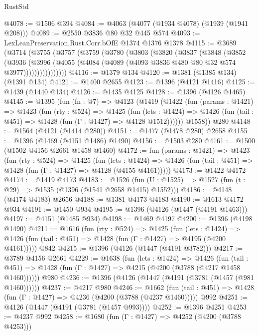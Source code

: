 \begin{lexlean}{RustStd}
\begin{coremodule}
@4078 := @1506 @394
@4084 := @4063 (@4077 (@1934 @4078) (@1939 (@1941 @208)))
@4089 := @2550 @3836 @80 @32 @445 @574
@4093 := LexLeanPreservation.Rust.Corr.bOfE @1374 @1376 @1378
@4115 := @3689
    (@3714
      (@3755
        (@3757
          (@3759
            (@3780
              (@3803
                (@3820
                  (@3837
                    (@3848
                      (@3852
                        (@3936
                          (@3996
                            (@4055
                              (@4084 (@4089 (@4093 @3836 @480 @80 @32 @574 @3977))))))))))))))))
@4116 := @1379 @134
@4120 := @1381 (@1385 @134) (@1391 @134)
@4121 := @1400 @2655
@4123 := @1396 (@4121 @1416)
@4125 := @1439 (@1440 @134)
@4126 := @1435 @4125
@4128 := @1396 (@4126 @1465)
@4145 := @1395
    (fun (fn : @7) =>
    @4123
      (@1419
        (@1422
          (fun (params : @1421) =>
          @1423
            (fun (rty : @524) =>
            @1425
              (fun (lets : @1424) =>
              @1426 (fun (tail : @451) => @1428 (fun (Γ : @1427) => @4128 @1512))))))
        @1558))
    @280
@4148 := @1564 (@4121 (@1414 @280))
@4151 := @1477 (@1478 @280) @2658
@4155 := @1396 (@1469 (@4151 @1486) @1490)
@4156 := @1503 @280
@4161 := @1500 (@1502 @4156 @2661 @1458 @1460)
@4172 := fun (params : @1421) =>
  @1423
    (fun (rty : @524) =>
    @1425
      (fun (lets : @1424) =>
      @1426 (fun (tail : @451) => @1428 (fun (Γ : @1427) => @4128 (@4155 @4161)))))
@4173 := @1422 @4172
@4174 := @1419 @4173
@4183 := @1526 (fun (U : @1525) => @1527 (fun (t : @29) => @1535 (@1396 (@1541 @2658 @1415) @1552)))
@4186 := @4148 (@4174 @4183) @2656
@4188 := @1381 @4173 @4183
@4190 := @1613 @4172 @934
@4191 := @1450 @934
@4195 := @1396 (@4126 (@1447 (@4191 @1463)))
@4197 := @4151 (@1485 @934)
@4198 := @1469 @4197
@4200 := @1396 (@4198 @1490)
@4211 := @1616
    (fun (rty : @524) =>
    @1425
      (fun (lets : @1424) =>
      @1426 (fun (tail : @451) => @1428 (fun (Γ : @1427) => @4195 (@4200 @4161)))))
    @842
@4215 := @1396 (@4126 (@1447 (@4191 @3782)))
@4217 := @3789 @4156 @2661
@4229 := @1638
    (fun (lets : @1424) =>
    @1426
      (fun (tail : @451) => @1428 (fun (Γ : @1427) => @4215 (@4200 (@3788 (@4217 @1458 @1460))))))
    @980
@4236 := @1396 (@4126 (@1447 (@4191 (@3781 (@1457 (@981 @1460))))))
@4237 := @4217 @980
@4246 := @1662
    (fun (tail : @451) => @1428 (fun (Γ : @1427) => @4236 (@4200 (@3788 (@4237 @1460)))))
    @992
@4251 := @4126 (@1447 (@4191 (@3781 (@1457 @993))))
@4252 := @1396 @4251
@4253 := @4237 @992
@4258 := @1680 (fun (Γ : @1427) => @4252 (@4200 (@3788 @4253)))

\end{coremodule}
\end{lexlean}
